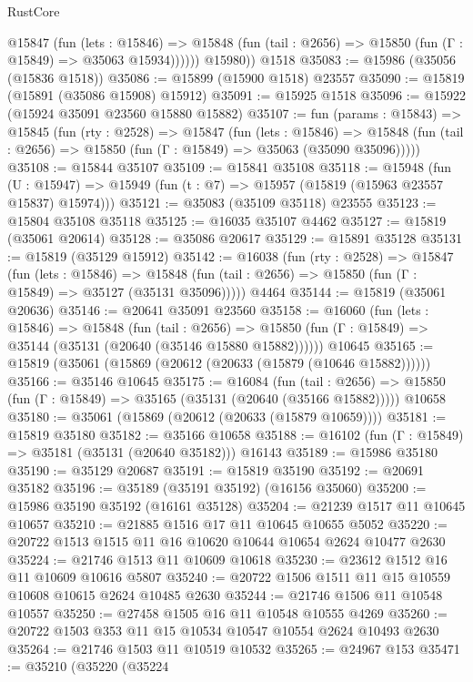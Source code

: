 \begin{lexlean}{RustCore}
\begin{coremodule}
            @15847
              (fun (lets : @15846) =>
              @15848 (fun (tail : @2656) => @15850 (fun (Γ : @15849) => @35063 @15934))))))
        @15980))
    @1518
@35083 := @15986 (@35056 (@15836 @1518))
@35086 := @15899 (@15900 @1518) @23557
@35090 := @15819 (@15891 (@35086 @15908) @15912)
@35091 := @15925 @1518
@35096 := @15922 (@15924 @35091 @23560 @15880 @15882)
@35107 := fun (params : @15843) =>
  @15845
    (fun (rty : @2528) =>
    @15847
      (fun (lets : @15846) =>
      @15848 (fun (tail : @2656) => @15850 (fun (Γ : @15849) => @35063 (@35090 @35096)))))
@35108 := @15844 @35107
@35109 := @15841 @35108
@35118 := @15948
    (fun (U : @15947) => @15949 (fun (t : @7) => @15957 (@15819 (@15963 @23557 @15837) @15974)))
@35121 := @35083 (@35109 @35118) @23555
@35123 := @15804 @35108 @35118
@35125 := @16035 @35107 @4462
@35127 := @15819 (@35061 @20614)
@35128 := @35086 @20617
@35129 := @15891 @35128
@35131 := @15819 (@35129 @15912)
@35142 := @16038
    (fun (rty : @2528) =>
    @15847
      (fun (lets : @15846) =>
      @15848 (fun (tail : @2656) => @15850 (fun (Γ : @15849) => @35127 (@35131 @35096)))))
    @4464
@35144 := @15819 (@35061 @20636)
@35146 := @20641 @35091 @23560
@35158 := @16060
    (fun (lets : @15846) =>
    @15848
      (fun (tail : @2656) =>
      @15850 (fun (Γ : @15849) => @35144 (@35131 (@20640 (@35146 @15880 @15882))))))
    @10645
@35165 := @15819 (@35061 (@15869 (@20612 (@20633 (@15879 (@10646 @15882))))))
@35166 := @35146 @10645
@35175 := @16084
    (fun (tail : @2656) => @15850 (fun (Γ : @15849) => @35165 (@35131 (@20640 (@35166 @15882)))))
    @10658
@35180 := @35061 (@15869 (@20612 (@20633 (@15879 @10659))))
@35181 := @15819 @35180
@35182 := @35166 @10658
@35188 := @16102 (fun (Γ : @15849) => @35181 (@35131 (@20640 @35182))) @16143
@35189 := @15986 @35180
@35190 := @35129 @20687
@35191 := @15819 @35190
@35192 := @20691 @35182
@35196 := @35189 (@35191 @35192) (@16156 @35060)
@35200 := @15986 @35190 @35192 (@16161 @35128)
@35204 := @21239 @1517 @11 @10645 @10657
@35210 := @21885 @1516 @17 @11 @10645 @10655 @5052
@35220 := @20722 @1513 @1515 @11 @16 @10620 @10644 @10654 @2624 @10477 @2630
@35224 := @21746 @1513 @11 @10609 @10618
@35230 := @23612 @1512 @16 @11 @10609 @10616 @5807
@35240 := @20722 @1506 @1511 @11 @15 @10559 @10608 @10615 @2624 @10485 @2630
@35244 := @21746 @1506 @11 @10548 @10557
@35250 := @27458 @1505 @16 @11 @10548 @10555 @4269
@35260 := @20722 @1503 @353 @11 @15 @10534 @10547 @10554 @2624 @10493 @2630
@35264 := @21746 @1503 @11 @10519 @10532
@35265 := @24967 @153
@35471 := @35210
    (@35220
      (@35224

\end{coremodule}
\end{lexlean}
